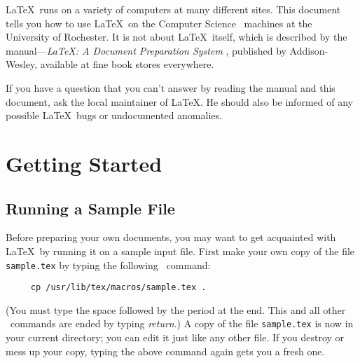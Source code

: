 



\maketitle

\begin{abstract}
This document is a beginners' guide to the \LaTeX\ text
formatting system in use in the department.
\end{abstract}

\tableofcontents

\newpage
{}

\LaTeX\ runs on a variety of computers at many different sites.  This
document tells you how to use \LaTeX\ on the Computer Science \UNIX\
machines at the University of Rochester.
It is not about \LaTeX\ itself, which is described by
the manual---{\em \LaTeX: A Document Preparation System} \cite{Lamport86},
published by Addison-Wesley, available at fine book stores everywhere.

If you have a question that you can't answer by reading the manual and
this document, ask the local maintainer of \LaTeX.
He should also be informed of any
possible \LaTeX\ bugs or undocumented anomalies.

\section{Getting Started}

\subsection{Running a Sample File} \label{sec:sample}

Before preparing your own documents, you may want to get acquainted
with \LaTeX\ by running it on a sample input file.  First make your own
copy of the file \mbox{\tt sample.tex} by typing the following
\UNIX\ command:
\begin{verbatim}
     cp /usr/lib/tex/macros/sample.tex .
\end{verbatim}
(You must type the space followed by the period at the end.  This
and all other \UNIX\ commands are ended by typing {\em return}.)
A copy of the file \mbox{\tt sample.tex} is now in your current
directory; you can edit it just like any other file.  If you destroy or
mess up your copy, typing the above command again gets you a fresh
one.

